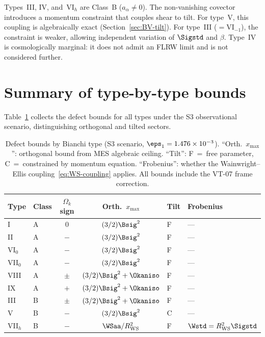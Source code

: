 Types~III, IV, and~VI$_h$ are Class~B ($a_\alpha \neq 0$).
The non-vanishing covector introduces a momentum constraint
that couples shear to tilt.  For type~V, this coupling is
algebraically exact (Section~\ref{sec:BV-tilt}).  For type~III
($= \mathrm{VI}_{-1}$), the constraint is weaker, allowing
independent variation of $\Sigstd$ and $\beta$.  Type~IV is
cosmologically marginal: it does not admit an FLRW limit and
is not considered further.


\section{Summary of type-by-type bounds}\label{sec:summary}

Table~\ref{tab:type-summary} collects the defect bounds for
all types under the S3 observational scenario, distinguishing
orthogonal and tilted sectors.

\begin{table}[h]
\caption{Defect bounds by Bianchi type (S3 scenario,
$\eps_1 = 1.476 \times 10^{-3}$).  ``Orth.\ $x_{\max}$'':
orthogonal bound from MES algebraic ceiling.  ``Tilt'': F~=~free
parameter, C~=~constrained by momentum equation.
``Frobenius'': whether the Wainwright--Ellis
coupling~\eqref{eq:WS-coupling} applies.
All bounds include the VT-07 frame correction.}
\label{tab:type-summary}
\centering\footnotesize\setlength{\tabcolsep}{3.5pt}
\begin{tabular}{llccll}
\toprule
Type & Class & $\Omega_k$ sign
     & Orth.\ $x_{\max}$ & Tilt & Frobenius \\
\midrule
I       & A & $0$  & $(3/2)\Bsig^2$         & F  & --- \\
II      & A & $-$  & $(3/2)\Bsig^2$         & F  & --- \\
VI$_0$  & A & $-$  & $(3/2)\Bsig^2$         & F  & --- \\
VII$_0$ & A & $-$  & $(3/2)\Bsig^2$         & F  & --- \\
VIII    & A & $\pm$& $(3/2)\Bsig^2 + \Okaniso$ & F  & --- \\
IX      & A & $+$  & $(3/2)\Bsig^2 + \Okaniso$ & F  & --- \\
\midrule
III     & B & $\pm$& $(3/2)\Bsig^2 + \Okaniso$ & F  & --- \\
V       & B & $-$  & $(3/2)\Bsig^2$             & C  & --- \\
VII$_h$ & B & $-$  & $\WSaa/R_{\rm WS}^2$       & F  &
  $\Wstd = R_{\rm WS}^2\Sigstd$ \\
\bottomrule
\end{tabular}
\end{table}

